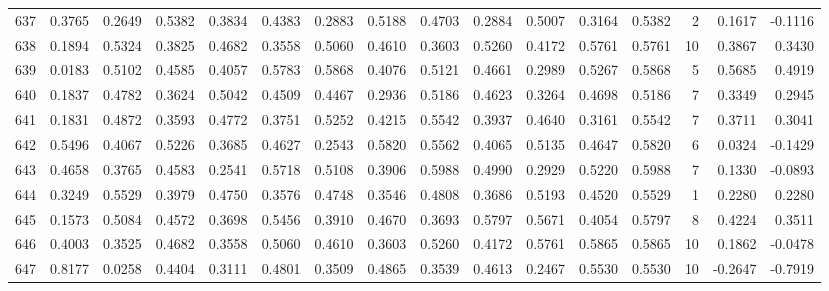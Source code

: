 \begin{tabular}{lrrrrrrrrrrrrrrr}
637 &      0.3765 &  0.2649 &  0.5382 &  0.3834 &  0.4383 &  0.2883 &  0.5188 &  0.4703 &  0.2884 &  0.5007 &   0.3164 &     0.5382 &      2 &                    0.1617 &                    -0.1116 \\
638 &      0.1894 &  0.5324 &  0.3825 &  0.4682 &  0.3558 &  0.5060 &  0.4610 &  0.3603 &  0.5260 &  0.4172 &   0.5761 &     0.5761 &     10 &                    0.3867 &                     0.3430 \\
639 &      0.0183 &  0.5102 &  0.4585 &  0.4057 &  0.5783 &  0.5868 &  0.4076 &  0.5121 &  0.4661 &  0.2989 &   0.5267 &     0.5868 &      5 &                    0.5685 &                     0.4919 \\
640 &      0.1837 &  0.4782 &  0.3624 &  0.5042 &  0.4509 &  0.4467 &  0.2936 &  0.5186 &  0.4623 &  0.3264 &   0.4698 &     0.5186 &      7 &                    0.3349 &                     0.2945 \\
641 &      0.1831 &  0.4872 &  0.3593 &  0.4772 &  0.3751 &  0.5252 &  0.4215 &  0.5542 &  0.3937 &  0.4640 &   0.3161 &     0.5542 &      7 &                    0.3711 &                     0.3041 \\
642 &      0.5496 &  0.4067 &  0.5226 &  0.3685 &  0.4627 &  0.2543 &  0.5820 &  0.5562 &  0.4065 &  0.5135 &   0.4647 &     0.5820 &      6 &                    0.0324 &                    -0.1429 \\
643 &      0.4658 &  0.3765 &  0.4583 &  0.2541 &  0.5718 &  0.5108 &  0.3906 &  0.5988 &  0.4990 &  0.2929 &   0.5220 &     0.5988 &      7 &                    0.1330 &                    -0.0893 \\
644 &      0.3249 &  0.5529 &  0.3979 &  0.4750 &  0.3576 &  0.4748 &  0.3546 &  0.4808 &  0.3686 &  0.5193 &   0.4520 &     0.5529 &      1 &                    0.2280 &                     0.2280 \\
645 &      0.1573 &  0.5084 &  0.4572 &  0.3698 &  0.5456 &  0.3910 &  0.4670 &  0.3693 &  0.5797 &  0.5671 &   0.4054 &     0.5797 &      8 &                    0.4224 &                     0.3511 \\
646 &      0.4003 &  0.3525 &  0.4682 &  0.3558 &  0.5060 &  0.4610 &  0.3603 &  0.5260 &  0.4172 &  0.5761 &   0.5865 &     0.5865 &     10 &                    0.1862 &                    -0.0478 \\
647 &      0.8177 &  0.0258 &  0.4404 &  0.3111 &  0.4801 &  0.3509 &  0.4865 &  0.3539 &  0.4613 &  0.2467 &   0.5530 &     0.5530 &     10 &                   -0.2647 &                    -0.7919 \\

\end{tabular}
